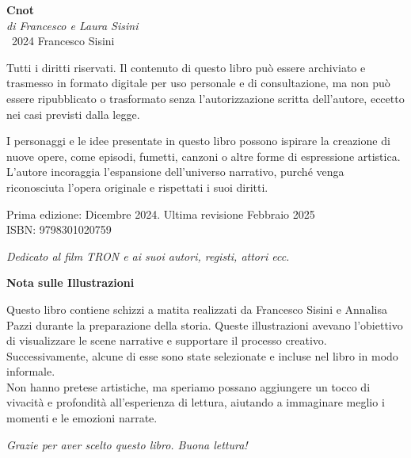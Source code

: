 
\clearpage
\thispagestyle{empty}
\begin{center}
\vspace*{2cm}

\textbf{\Huge Cnot}\\[0.5cm]

\textit{di Francesco e Laura Sisini}\\[2cm]

\textcopyright\ 2024 Francesco Sisini\\[0.5cm]

\end{center}

Tutti i diritti riservati. Il contenuto di questo libro può essere archiviato e trasmesso in formato digitale per uso personale e di consultazione, ma non può essere ripubblicato o trasformato senza l'autorizzazione scritta dell'autore, eccetto nei casi previsti dalla legge.

I personaggi e le idee presentate in questo libro possono ispirare la creazione di nuove opere, come episodi, fumetti, canzoni o altre forme di espressione artistica. L'autore incoraggia l'espansione dell'universo narrativo, purché venga riconosciuta l'opera originale e rispettati i suoi diritti.\\[1cm]

\begin{center}

Prima edizione: Dicembre 2024. Ultima revisione Febbraio 2025\\[0.5cm]

ISBN: 9798301020759\\[2cm]


\vfill

\textit{Dedicato al film TRON e ai suoi autori, registi, attori ecc.}

\end{center}


\clearpage
\thispagestyle{empty}
\begin{center}
\vspace*{2cm}
\textbf{\LARGE Nota sulle Illustrazioni}\\[1cm]
\end{center}

\noindent Questo libro contiene schizzi a matita realizzati da Francesco Sisini e Annalisa Pazzi durante la preparazione della storia. Queste illustrazioni avevano l'obiettivo di visualizzare le scene narrative e supportare il processo creativo. Successivamente, alcune di esse sono state selezionate e incluse nel libro in modo informale.\\[0.5cm]

\noindent Non hanno pretese artistiche, ma speriamo possano aggiungere un tocco di vivacità e profondità all'esperienza di lettura, aiutando a immaginare meglio i momenti e le emozioni narrate.

\vspace*{2cm}
\begin{center}
\textit{Grazie per aver scelto questo libro. Buona lettura!}
\end{center}
